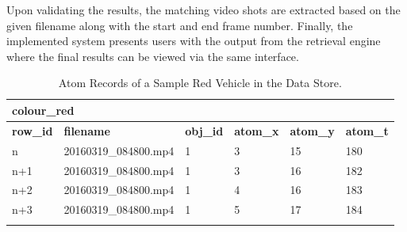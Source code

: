 Upon validating the results, %
the matching video shots are extracted based on the given filename along with the start and end frame number. Finally, the implemented system presents users with the output from the retrieval engine where the final results can be viewed via the same interface.


\begin{table}[tb!]
	\centering
  \caption{Atom Records of a Sample Red Vehicle in the Data Store. %
  }
  \label{table:dbSample}
  \begin{tabular}{llllll}
  \multicolumn{6}{l}{{ colour\_red}} \\ \hline
  \multicolumn{1}{|l|}{\textbf{row\_id}} & \multicolumn{1}{l|}{\textbf{filename}}    & \multicolumn{1}{l|}{\textbf{obj\_id}} & \multicolumn{1}{l|}{\textbf{atom\_x}} & \multicolumn{1}{l|}{\textbf{atom\_y}} & \multicolumn{1}{l|}{\textbf{atom\_t}} \\ \hline
  \multicolumn{1}{|l|}{n}                & \multicolumn{1}{l|}{20160319\_084800.mp4} & \multicolumn{1}{l|}{1}                & \multicolumn{1}{l|}{3}                & \multicolumn{1}{l|}{15}               & \multicolumn{1}{l|}{180}              \\ \hline
  \multicolumn{1}{|l|}{n+1}              & \multicolumn{1}{l|}{20160319\_084800.mp4} & \multicolumn{1}{l|}{1}                & \multicolumn{1}{l|}{3}                & \multicolumn{1}{l|}{16}               & \multicolumn{1}{l|}{182}              \\ \hline
  \multicolumn{1}{|l|}{n+2}              & \multicolumn{1}{l|}{20160319\_084800.mp4} & \multicolumn{1}{l|}{1}                & \multicolumn{1}{l|}{4}                & \multicolumn{1}{l|}{16}               & \multicolumn{1}{l|}{183}              \\ \hline
  \multicolumn{1}{|l|}{n+3}              & \multicolumn{1}{l|}{20160319\_084800.mp4} & \multicolumn{1}{l|}{1}                & \multicolumn{1}{l|}{5}                & \multicolumn{1}{l|}{17}               & \multicolumn{1}{l|}{184}              \\ \hline
                                         &                                           &                                       &                                       &                                       &                                       \\

\end{tabular}
\end{table}
